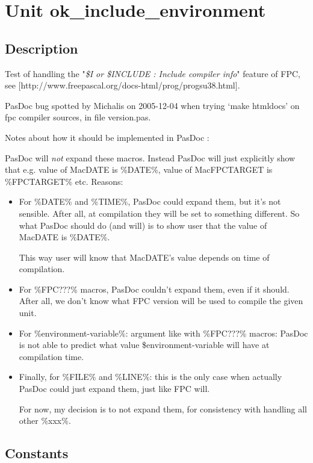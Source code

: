 \documentclass{report}
\begin{document}
\newlength{\tmplength}
\chapter{Unit ok{\_}include{\_}environment}
\section{Description}
Test of handling the "\textit{{\$}I or {\$}INCLUDE : Include compiler info}" feature of FPC, see [http://www.freepascal.org/docs-html/prog/progsu38.html].\hfill\vspace*{1ex}



PasDoc bug spotted by Michalis on 2005{-}12{-}04 when trying `make htmldocs' on fpc compiler sources, in file version.pas.

Notes about how it should be implemented in PasDoc :

PasDoc will \textit{not} expand these macros. Instead PasDoc will just explicitly show that e.g. value of MacDATE is {\%}DATE{\%}, value of MacFPCTARGET is {\%}FPCTARGET{\%} etc. Reasons: \begin{itemize}
\item For {\%}DATE{\%} and {\%}TIME{\%}, PasDoc could expand them, but it's not sensible. After all, at compilation they will be set to something different. So what PasDoc should do (and will) is to show user that the value of MacDATE is {\%}DATE{\%}.

This way user will know that MacDATE's value depends on time of compilation.
\item For {\%}FPC???{\%} macros, PasDoc couldn't expand them, even if it should. After all, we don't know what FPC version will be used to compile the given unit.
\item For {\%}environment{-}variable{\%}: argument like with {\%}FPC???{\%} macros: PasDoc is not able to predict what value {\$}environment{-}variable will have at compilation time.
\item Finally, for {\%}FILE{\%} and {\%}LINE{\%}: this is the only case when actually PasDoc could just expand them, just like FPC will.

For now, my decision is to not expand them, for consistency with handling all other {\%}xxx{\%}.
\end{itemize}
\section{Constants}
\end{document}
